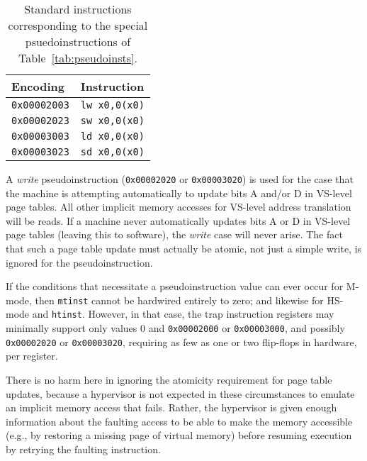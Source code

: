 \begin{table*}[h!]
\begin{center}
\begin{tabular}{|l|l|}
\hline
Encoding         & Instruction \\ \hline
{\tt 0x00002003} & {\tt lw x0,0(x0)} \\
{\tt 0x00002023} & {\tt sw x0,0(x0)} \\ \hline
{\tt 0x00003003} & {\tt ld x0,0(x0)} \\
{\tt 0x00003023} & {\tt sd x0,0(x0)} \\ \hline
\end{tabular}
\end{center}
\caption{Standard instructions corresponding to the special
psuedoinstructions of Table~\ref{tab:pseudoinsts}.}
\label{tab:pseudoinsts-basis}
\end{table*}

A \textit{write} pseudoinstruction ({\tt 0x00002020} or {\tt 0x00003020})
is used for the case that the machine is attempting automatically to
update bits A and/or D in VS-level page tables.
All other implicit memory accesses for VS-level address translation will
be reads.
If a machine never automatically updates bits A or D in VS-level page
tables (leaving this to software), the \textit{write} case will never
arise.
The fact that such a page table update must actually be atomic, not just
a simple write, is ignored for the pseudoinstruction.

\begin{commentary}
If the conditions that necessitate a pseudoinstruction value can ever
occur for M-mode, then {\tt mtinst} cannot be hardwired entirely to zero;
and likewise for HS-mode and {\tt htinst}.
However, in that case, the trap instruction registers may minimally
support only values 0 and {\tt 0x00002000} or {\tt 0x00003000}, and
possibly {\tt 0x00002020} or {\tt 0x00003020}, requiring as few as one or
two flip-flops in hardware, per register.
\end{commentary}

\begin{commentary}
There is no harm here in ignoring the atomicity requirement for page
table updates, because a hypervisor is not expected in these
circumstances to emulate an implicit memory access that fails.
Rather, the hypervisor is given enough information about the faulting
access to be able to make the memory accessible (e.g., by restoring a
missing page of virtual memory) before resuming execution by retrying the
faulting instruction.
\end{commentary}

